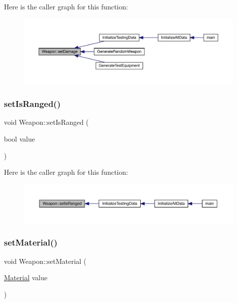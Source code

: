 Here is the caller graph for this function\+:
\nopagebreak
\begin{figure}[H]
\begin{center}
\leavevmode
\includegraphics[width=350pt]{db/de5/class_weapon_a0c582ba1c1413a4ecda931bb8acff458_icgraph}
\end{center}
\end{figure}
\mbox{\label{class_weapon_a73bb6176d7e535811f30a3ee9df53b8d}} 
\subsubsection{\texorpdfstring{set\+Is\+Ranged()}{setIsRanged()}}
{\footnotesize\ttfamily void Weapon\+::set\+Is\+Ranged (\begin{DoxyParamCaption}\item[{bool}]{value }\end{DoxyParamCaption})}

Here is the caller graph for this function\+:
\nopagebreak
\begin{figure}[H]
\begin{center}
\leavevmode
\includegraphics[width=350pt]{db/de5/class_weapon_a73bb6176d7e535811f30a3ee9df53b8d_icgraph}
\end{center}
\end{figure}
\mbox{\label{class_weapon_a2861d732a0cccff20a9ea29548d05702}} 
\subsubsection{\texorpdfstring{set\+Material()}{setMaterial()}}
{\footnotesize\ttfamily void Weapon\+::set\+Material (\begin{DoxyParamCaption}\item[{\mbox{\hyperlink{class_material}{Material}}}]{value }\end{DoxyParamCaption})}

